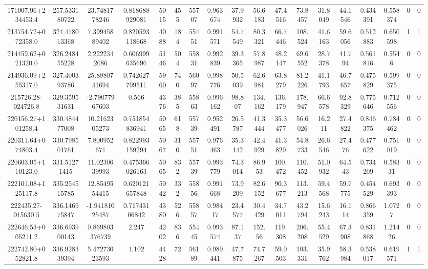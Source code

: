 \begin{table}
\begin{tabular}{cccccccccccccccccc}
171007.96+234453.4 & 257.533180722 & 23.7481778246 & 0.818688929081 & 5015 & 455 & 55707 & 0.963674 & 37.9932 & 56.6183 & 47.4516 & 73.8457 & 31.8049 & 44.1546 & 0.434391 & 0.558374 & 0 & 0 \\
213754.72+072358.0 & 324.478013368 & 7.39945889402 & 0.820593118668 & 4088 & 184 & 55451 & 0.991571 & 54.7549 & 80.3321 & 66.7446 & 108.524 & 41.6163 & 59.6056 & 0.512883 & 0.650598 & 1 & 1 \\
214459.62+021320.0 & 326.248455228 & 2.2222342086 & 0.606999635696 & 5146 & 504 & 55831 & 0.992839 & 39.3365 & 57.8987 & 48.2147 & 69.6552 & 28.7378 & 41.794 & 0.561816 & 0.5546 & 0 & 0 \\
214936.09+255317.0 & 327.400393786 & 25.8880741694 & 0.742627799511 & 5960 & 740 & 56097 & 0.998776 & 50.5039 & 62.6981 & 63.8279 & 81.2226 & 41.1793 & 46.7657 & 0.475829 & 0.599375 & 0 & 0 \\
215726.28-024726.8 & 329.359531631 & -2.79077967603 & 0.566 & 4376 & 385 & 55863 & 0.996162 & 98.807 & 134.162 & 136.179 & 178.947 & 66.6578 & 92.8329 & 0.775646 & 0.712556 & 0 & 0 \\
220156.27+101258.4 & 330.484477008 & 10.2162305273 & 0.751854836941 & 5065 & 618 & 55739 & 0.952491 & 26.5787 & 41.3444 & 35.3477 & 56.6026 & 16.211 & 27.4822 & 0.846375 & 0.784462 & 0 & 0 \\
220311.64+074803.4 & 330.798501761 & 7.800952671 & 0.822993159294 & 5067 & 310 & 55751 & 0.976463 & 35.3142 & 42.4929 & 41.3829 & 54.8733 & 26.6546 & 27.476 & 0.477622 & 0.751019 & 0 & 0 \\
220603.05+110123.0 & 331.51271415 & 11.0230639993 & 0.475366026163 & 5065 & 832 & 55739 & 0.993779 & 74.3014 & 86.953 & 100.472 & 110.452 & 51.0932 & 64.543 & 0.734209 & 0.58331 & 0 & 0 \\
222101.08+125117.8 & 335.254515785 & 12.8549554415 & 0.620121657848 & 5042 & 332 & 55856 & 0.991668 & 73.9209 & 82.6152 & 90.3677 & 113.213 & 59.4568 & 59.7775 & 0.454529 & 0.693393 & 0 & 0 \\
222435.27-015630.5 & 336.146975847 & -1.94181025487 & 0.71743106842 & 4380 & 526 & 55857 & 0.98417 & 23.4577 & 30.4429 & 34.7011 & 43.2794 & 15.6243 & 16.114 & 0.866359 & 1.0727 & 0 & 0 \\
222646.53+005211.2 & 336.693900143 & 0.869803376739 & 2.247 & 4202 & 836 & 55445 & 0.993574 & 87.137 & 152.56 & 119.308 & 206.208 & 55.4529 & 67.3908 & 0.831868 & 1.21426 & 0 & 0 \\
222742.80+052821.8 & 336.928339394 & 5.47273023593 & 1.102 & 4428 & 72 & 56189 & 0.989441 & 47.7875 & 74.7267 & 59.0503 & 103.331 & 35.9762 & 58.3984 & 0.538017 & 0.619571 & 1 & 1 \\

\end{tabular}
\end{table}
